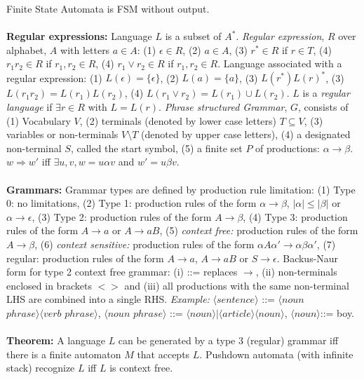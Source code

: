 Finite State Automata is FSM without output.\\
\\
{\bf Regular expressions:}
Language $L$ is a subset of $A^*$.
\emph{Regular expression}, $R$ over alphabet, $A$ with letters 
$a \in A$: (1) $ \epsilon \in R$,
(2) $a \in A$, (3) $r^* \in R$ if $r \in T$,
(4) $r_1 r_2 \in R$ if $r_1 , r_2 \in R$,
(4) $r_1 \vee r_2 \in R$ if $r_1 , r_2 \in R$.
Language associated with a regular expression: (1) $ L(\epsilon)=\{ \epsilon \}$,
(2) $L(a)= \{a\}$, (3) $L(r^*) L(r)^*$,
(3) $L(r_1 r_2)= L(r_1 ) L(r_2)$,
(4) $L(r_1 \vee r_2) = L(r_1) \cup L(r_2)$.
$L$ is a \emph{regular language} if $\exists r \in R$ with $L=L(r)$.
\emph{Phrase structured Grammar}, 
$G$, consists of (1) Vocabulary $V$, (2) terminals (denoted by lower case letters) 
$T \subseteq V$, (3) variables or non-terminals $V \setminus T$ (denoted
by upper case letters), (4) a designated non-terminal $S$, called the start symbol, (5)
a finite set $P$ of productions: $\alpha \rightarrow \beta$.
$w \Rightarrow w'$ iff $\exists u,v, w=u \alpha v$ and $w'= u \beta v$.
\\
\\
{\bf Grammars:}
Grammar types are defined by production rule limitation: (1) Type 0: no limitations,
(2) Type 1: production rules of the form
$\alpha \rightarrow \beta$, $|\alpha| \leq |\beta|$ or
$\alpha \rightarrow \epsilon$,
(3) Type 2: production rules of the form $A \rightarrow \beta$,
(4) Type 3: production rules of the form
$A \rightarrow a$ or $A \rightarrow aB$,
(5) \emph{context free:} production rules of the form $A \rightarrow \beta$,
(6) \emph{context sensitive:} production rules of the form
$\alpha A \alpha' \rightarrow \alpha \beta \alpha'$,
(7) regular: production rules of the form
$A \rightarrow a$, $A \rightarrow aB$ or $S \rightarrow \epsilon$.
Backus-Naur form for type 2 context free grammar:
(i) ::= replaces $\rightarrow$,
(ii) non-terminals enclosed in brackets $<>$ and
(iii) all productions with the same non-terminal
LHS are combined into a single RHS.
\emph{Example:} 
$\langle sentence  \rangle$ ::= 
$\langle noun$ $phrase \rangle\langle verb$ $phrase \rangle$, 
$\langle noun$ $phrase \rangle$ ::= 
$\langle noun \rangle|\langle article \rangle\langle noun \rangle$,
$\langle noun \rangle$::= boy.
\\
\\
{\bf Theorem:}
A language $L$ can be generated by a type 3 (regular) grammar iff there is a finite
automaton $M$ that accepts $L$.
Pushdown automata (with infinite stack) recognize $L$ iff $L$ is context free.
